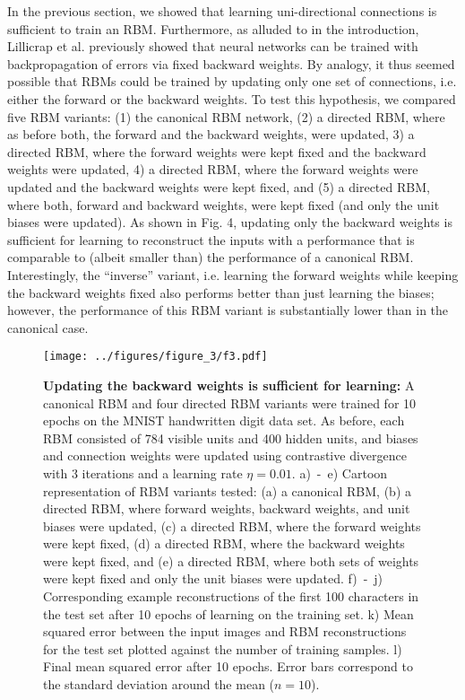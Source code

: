 \documentclass[11pt]{article}
\begin{document}
In the previous section, we showed that learning uni-directional
connections is sufficient to train an RBM. Furthermore, as alluded to
in the introduction, Lillicrap et al. previously showed that neural
networks can be trained with backpropagation of errors via fixed
backward weights. By analogy, it thus seemed possible that RBMs could
be trained by updating only one set of connections, i.e. either the
forward or the backward weights. To test this hypothesis, we compared
five RBM variants: (1) the canonical RBM network, (2) a directed RBM,
where as before both, the forward and the backward weights, were
updated, 3) a directed RBM, where the forward weights were kept fixed
and the backward weights were updated, 4) a directed RBM, where the
forward weights were updated and the backward weights were kept fixed,
and (5) a directed RBM, where both, forward and backward weights, were
kept fixed (and only the unit biases were updated). As shown in
Fig. 4, updating only the backward weights is sufficient for learning
to reconstruct the inputs with a performance that is comparable to
(albeit smaller than) the performance of a canonical
RBM. Interestingly, the ``inverse'' variant, i.e. learning the forward
weights while keeping the backward weights fixed also performs better
than just learning the biases; however, the performance of this RBM
variant is substantially lower than in the canonical case.

\begin{figure}[H]
  \label{fig:backward_rbm}
  \centering
  \texttt{[image: ../figures/figure\_3/f3.pdf]}
  \caption{\footnotesize
    \textbf{Updating the backward weights is sufficient for learning:}
    A canonical RBM and four directed RBM variants were trained for 10 epochs on the MNIST handwritten digit data set.
    As before, each RBM consisted of 784 visible units and 400 hidden
    units, and biases and connection weights were updated using contrastive
    divergence with 3 iterations and a learning rate $\eta=0.01$.
    a)~-~e) Cartoon representation of RBM variants tested:
    (a) a canonical RBM,
    (b) a directed RBM, where forward weights, backward weights, and unit biases were updated,
    (c) a directed RBM, where the forward weights were kept fixed,
    (d) a directed RBM, where the backward weights were kept fixed, and
    (e) a directed RBM, where both sets of weights were kept fixed and only the unit biases were updated.
    f)~-~j) Corresponding example reconstructions of the first 100 characters in the test set after 10 epochs of learning on the training set.
    k) Mean squared error between the input images and RBM reconstructions for the test set plotted against the number of training samples.
    l) Final mean squared error after 10 epochs. Error bars correspond to the standard deviation around the mean ($n = 10$).
  }
\end{figure}
\end{document}
